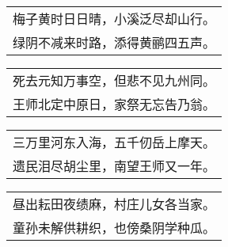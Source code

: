 \noindent\begin{minipage}{\linewidth}
  \vskip-3pt\begin{table}[H]
    \centering
    \begin{tabular}{@{}l@{}}
梅子黄时日日晴，小溪泛尽却山行。\\
绿阴不减来时路，添得黄鹂四五声。
    \end{tabular}
  \end{table}
\end{minipage}
\vspace{1cm}


\noindent\begin{minipage}{\linewidth}
  \vskip-3pt\begin{table}[H]
    \centering
    \begin{tabular}{@{}l@{}}
死去元知万事空，但悲不见九州同。\\
王师北定中原日，家祭无忘告乃翁。
    \end{tabular}
  \end{table}
\end{minipage}
\vspace{1cm}


\noindent\begin{minipage}{\linewidth}
  \vskip-3pt\begin{table}[H]
    \centering
    \begin{tabular}{@{}l@{}}
三万里河东入海，五千仞岳上摩天。\\
遗民泪尽胡尘里，南望王师又一年。
    \end{tabular}
  \end{table}
\end{minipage}
\vspace{1cm}


\noindent\begin{minipage}{\linewidth}
  \vskip-3pt\begin{table}[H]
    \centering
    \begin{tabular}{@{}l@{}}
昼出耘田夜绩麻，村庄儿女各当家。\\
童孙未解供耕织，也傍桑阴学种瓜。
    \end{tabular}
  \end{table}
\end{minipage}
\vspace{1cm}


